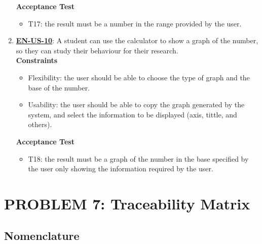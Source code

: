 \documentclass{report}
\begin{document}
\begin{enumerate}
\textbf{Acceptance Test}
\begin{itemize}
    \item T17: the result must be a number in the range provided by the user. \newline
\end{itemize}

\item \underline{\textbf{EN-US-10}}: A student can use the calculator to show a graph of the number, so they can study their behaviour for their research. \\ \newline
\textbf{Constraints}
\begin{itemize}
    \item Flexibility: the user should be able to choose the type of graph and the base of the number.
    \item Usability: the user should be able to copy the graph generated by the system, and select the information to be displayed (axis, tittle, and others).
\end{itemize}

\textbf{Acceptance Test}
\begin{itemize}
    \item T18: the result must be a graph of the number in the base specified by the user only showing the information required by the user. \newline
\end{itemize}
\end{enumerate}
\section{PROBLEM 7: Traceability Matrix }

\subsection{Nomenclature}
\end{document}
